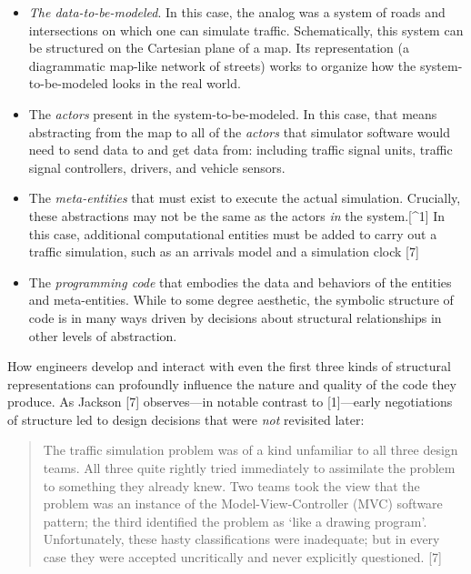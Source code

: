 \begin{itemize}
\tightlist
\item
  \emph{The data-to-be-modeled}. In this case, the analog was a system of roads and intersections on which one can simulate traffic. Schematically, this system can be structured on the Cartesian plane of a map. Its representation (a diagrammatic map-like network of streets) works to organize how the system-to-be-modeled looks in the real world.
\item
  The \emph{actors} present in the system-to-be-modeled. In this case, that means abstracting from the map to all of the \emph{actors} that simulator software would need to send data to and get data from: including traffic signal units, traffic signal controllers, drivers, and vehicle sensors.
\item
  The \emph{meta-entities} that must exist to execute the actual simulation. Crucially, these abstractions may not be the same as the actors \emph{in} the system.{[}\^{}1{]} In this case, additional computational entities must be added to carry out a traffic simulation, such as an arrivals model and a simulation clock {[}7{]}
\item
  The \emph{programming code} that embodies the data and behaviors of the entities and meta-entities. While to some degree aesthetic, the symbolic structure of code is in many ways driven by decisions about structural relationships in other levels of abstraction.
\end{itemize}

How engineers develop and interact with even the first three kinds of structural representations can profoundly influence the nature and quality of the code they produce. As Jackson {[}7{]} observes---in notable contrast to {[}1{]}---early negotiations of structure led to design decisions that were \emph{not} revisited later:

\begin{quote}
The traffic simulation problem was of a kind unfamiliar to all three design teams. All three quite rightly tried immediately to assimilate the problem to something they already knew. Two teams took the view that the problem was an instance of the Model-View-Controller (MVC) software pattern; the third identified the problem as `like a drawing program'. Unfortunately, these hasty classifications were inadequate; but in every case they were accepted uncritically and never explicitly questioned. {[}7{]}
\end{quote}

